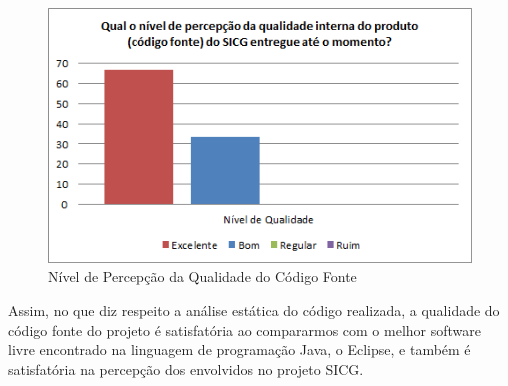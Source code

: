 \begin{figure}[H]
		\centering
			\includegraphics[scale=1.0]{figuras/percepcaoqualidade.png}
		\caption{Nível de Percepção da Qualidade do Código Fonte}
		\label{percepcaoqualidade}
\end{figure}

Assim, no que diz respeito a análise estática do código realizada, a qualidade do código fonte do projeto é satisfatória ao compararmos com o melhor software livre encontrado na linguagem de programação Java, o Eclipse, e também é satisfatória na percepção dos envolvidos no projeto SICG. 



